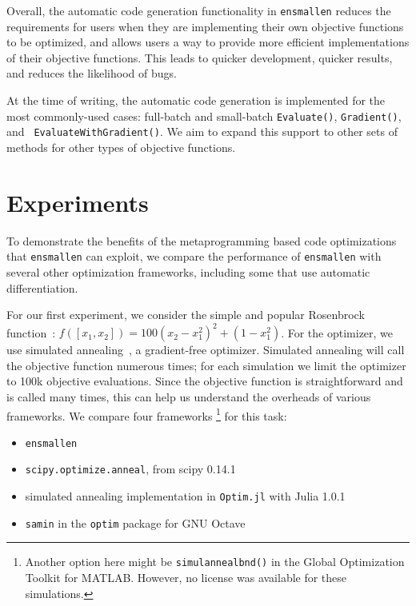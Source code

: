 \documentclass{article}
\begin{document}
Overall, the automatic code generation functionality in {\tt ensmallen}
reduces the requirements for users
when they are implementing their own objective functions to be optimized,
and allows users a way to provide more efficient implementations of their
objective functions.
This leads to quicker development, quicker results, and reduces the likelihood of bugs.

At the time of writing, the automatic code generation
is implemented for the most commonly-used cases:
full-batch and small-batch {\tt Evaluate()}, {\tt Gradient()}, and {\tt
EvaluateWithGradient()}.  We aim to expand this support to other
sets of methods for other types of objective functions.


\vspace*{-0.3em}
\section{Experiments}
\vspace*{-0.5em}

To demonstrate the benefits of the metaprogramming based code optimizations
that {\tt ensmallen} can exploit,
we compare the performance of {\tt ensmallen} with several other
optimization frameworks, including some that use automatic differentiation.

For our first experiment, we consider the simple and popular Rosenbrock
function~\cite{Rosenbrock1960}: $f([x_1, x_2]) = 100 (x_2 - x_1^2)^2 + (1 -
x_1^2)$.  For the optimizer, we use simulated
annealing~\cite{kirkpatrick1983optimization}, a gradient-free optimizer.
Simulated annealing will call the objective function numerous times; for each
simulation we limit the optimizer to 100k objective evaluations.  Since the
objective function is straightforward and is called many times, this can help us
understand the overheads of various frameworks.  We compare four frameworks%
%
\footnote{Another option here might be {\tt simulannealbnd()} 
in the Global Optimization Toolkit for MATLAB.
However, no license was available for these simulations.}
%
for this task:

\vspace*{-0.3em}
\begin{itemize} \itemsep -1pt
  \item {\tt ensmallen}
  \item {\tt scipy.optimize.anneal}, from scipy 0.14.1~\cite{jones2014scipy}
  \item simulated annealing implementation in {\tt Optim.jl} with Julia
1.0.1~\cite{mogensen2018optim}
  \item {\tt samin} in the {\tt optim} package for GNU Octave~\cite{octave}
\end{itemize}
\vspace*{-0.3em}
\end{document}
